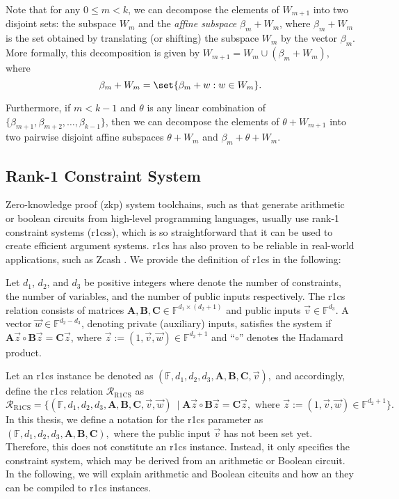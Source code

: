 Note that for any $0 \leq m < k$, we can decompose the elements of $W_{m+1}$ into two disjoint sets: the subspace $W_m$ and the \textit{affine subspace} $\beta_m + W_m$, where $\beta_m + W_m$ is the set obtained by translating (or shifting) the subspace $W_m$ by the vector $\beta_m$. More formally, this decomposition is given by $W_{m+1} = W_m \cup (\beta_m + W_m)$, where \[\beta_m + W_m = \set{\beta_m + w: w \in W_m} .\]

Furthermore, if $m < k-1$ and $\theta$ is any linear combination of $\{\beta_{m+1}, \beta_{m+2}, \ldots, \beta_{k-1}\}$, then we can decompose the elements of $\theta + W_{m+1}$ into two pairwise disjoint affine subspaces $\theta + W_m$ and $\beta_{m} + \theta + W_m$.

\subsection{Rank-1 Constraint System} \label{sec:prel_r1cs}

Zero-knowledge proof (\gls{zkp}) system toolchains, such as \cite{Groth2016, Aurora2019, Chiesa2020Fractal, Ames2017Ligero} that generate arithmetic or boolean circuits from high-level programming languages, usually use rank-1 constraint systems (\gls{r1cs}s), which is so straightforward that it can be used to create efficient argument systems. \gls{r1cs} has also proven to be reliable in real-world applications, such as Zcash \cite{zcash-proc}. We provide the definition of \gls{r1cs} in the following:

\begin{definition} \label{def:R1CS}
	Let $d_1$, $d_2$, and $d_3$ be positive integers where denote the number of constraints, the number of variables, and the number of public inputs respectively. The \gls{r1cs} relation consists of matrices $\mathbf{A},\mathbf{B},\mathbf{C} \in \mathbb{F}^{d_1\times (d_2+1)}$ and public inputs $\vec{{v}} \in \mathbb{F}^{d_3}$. A vector $\vec{{w}} \in \mathbb{F}^{d_2-d_3}$, denoting private (auxiliary) inputs, satisfies the system if
	\(
	\mathbf{A}\vec{{z}} \circ \mathbf{B}\vec{{z}} = \mathbf{C}\vec{{z}}
	\), 
	where $\vec{z}:=(1,\vec{v},\vec{w}) \in \mathbb{F}^{d_2+1}$ and “$\circ$” denotes the Hadamard product.
\end{definition}
Let an \gls{r1cs} instance be denoted as 
\(
(\mathbb{F}, d_1, d_2, d_3, \mathbf{A}, \mathbf{B}, \mathbf{C}, \vec{v}),
\)
and accordingly, define the \gls{r1cs} relation $\mathcal{R}_{\text{R1CS}}$ as   
\[
\mathcal{R}_{\text{R1CS}} = \{(\mathbb{F}, d_1, d_2, d_3, \mathbf{A}, \mathbf{B}, \mathbf{C}, \vec{v}, \vec{w})\ \mid  \mathbf{A}\vec{{z}} \circ \mathbf{B}\vec{{z}} = \mathbf{C}\vec{{z}}, \text{ where } \vec{z}:=(1,\vec{v},\vec{w}) \in \mathbb{F}^{d_2+1}\}.
\]
In this thesis, we define a notation for the \gls{r1cs} parameter as 
\(
(\mathbb{F}, d_1, d_2, d_3, \mathbf{A}, \mathbf{B}, \mathbf{C}),
\)
where the public input \(\vec{v}\) has not been set yet. Therefore, this does not constitute an \gls{r1cs} instance. Instead, it only specifies the constraint system, which may be derived from an arithmetic or Boolean circuit. In the following, we will explain arithmetic and Boolean citcuits and how an they can be compiled to \gls{r1cs} instances.


